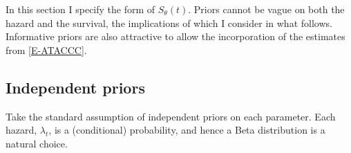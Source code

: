 \documentclass[thesis.tex]{subfiles}
\begin{document}
In this section I specify the form of $S_\theta(t)$.
Priors cannot be vague on both the hazard and the survival, the implications of which I consider in what follows.
Informative priors are also attractive to allow the incorporation of the estimates from \cref{E-ATACCC}.

\subsection{Independent priors} \label{perf-test:sec:independent-priors}
Take the standard assumption of independent priors on each parameter.
Each hazard, $\lambda_t$, is a (conditional) probability, and hence a Beta distribution is a natural choice.
\end{document}
